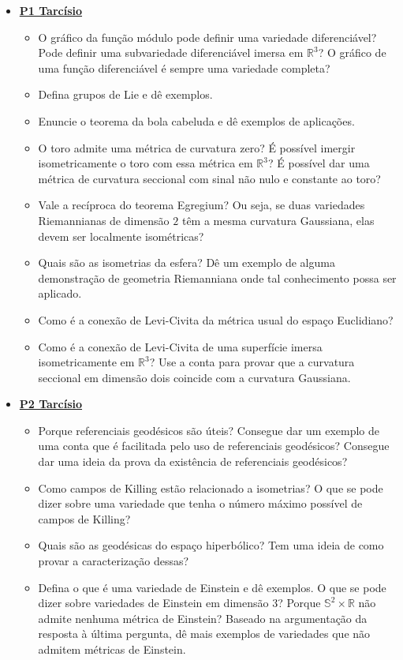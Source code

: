 \begin{itemize}
  \item \underline{\textbf{P1 Tarcísio}}
  \begin{itemize}
    \item O gráfico da função módulo pode definir uma variedade diferenciável? Pode definir uma subvariedade diferenciável imersa em $\mathbb{R}^3$? O gráfico de uma função diferenciável é sempre uma variedade completa? 
    \item Defina grupos de Lie e dê exemplos. 
    \item Enuncie o teorema da bola cabeluda e dê exemplos de aplicações.
    \item O toro admite uma métrica de curvatura zero? É possível imergir isometricamente o toro com essa métrica em $\mathbb{R}^3$? É possível dar uma métrica de curvatura seccional com sinal não nulo e constante ao toro? 
    \item Vale a recíproca do teorema Egregium? Ou seja, se duas variedades Riemannianas de dimensão $2$ têm a mesma curvatura Gaussiana, elas devem ser localmente isométricas?
    \item Quais são as isometrias da esfera? Dê um exemplo de alguma demonstração de geometria Riemanniana onde tal conhecimento possa ser aplicado. 
    \item Como é a conexão de Levi-Civita da métrica usual do espaço Euclidiano?
    \item Como é a conexão de Levi-Civita de uma superfície imersa isometricamente em $\mathbb{R}^3$? Use a conta para provar que a curvatura seccional em dimensão dois coincide com a curvatura Gaussiana.
  \end{itemize}
  \item \underline{\textbf{P2 Tarcísio}}
  \begin{itemize}
    \item Porque referenciais geodésicos são úteis? Consegue dar um exemplo de uma conta que é facilitada pelo uso de referenciais geodésicos? Consegue dar uma ideia da prova da existência de referenciais geodésicos?
    \item Como campos de Killing estão relacionado a isometrias? O que se pode dizer sobre uma variedade que tenha o número máximo possível de campos de Killing? 
    \item Quais são as geodésicas do espaço hiperbólico? Tem uma ideia de como provar a caracterização dessas?
    \item Defina o que é uma variedade de Einstein e dê exemplos. O que se pode dizer sobre variedades de Einstein em dimensão 3? Porque $\mathbb{S}^2 \times \mathbb{R}$ não admite nenhuma métrica de Einstein? Baseado na argumentação da resposta à última pergunta, dê mais exemplos de variedades que não admitem métricas de Einstein. 

\end{itemize}
\end{itemize}
